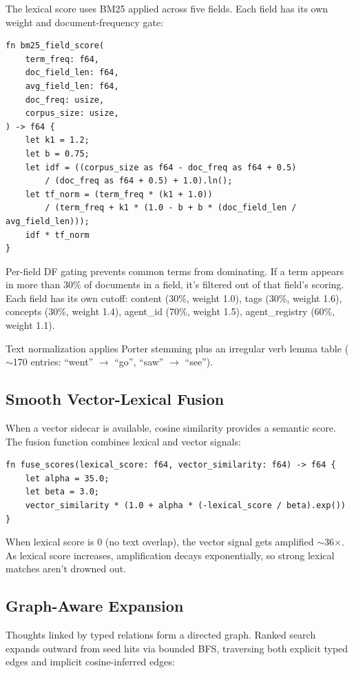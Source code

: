 \documentclass[11pt,a4paper]{article}
\begin{document}
The lexical score uses BM25 applied across five fields. Each field has its own weight and
document-frequency gate:

\begin{lstlisting}
fn bm25_field_score(
    term_freq: f64,
    doc_field_len: f64,
    avg_field_len: f64,
    doc_freq: usize,
    corpus_size: usize,
) -> f64 {
    let k1 = 1.2;
    let b = 0.75;
    let idf = ((corpus_size as f64 - doc_freq as f64 + 0.5)
        / (doc_freq as f64 + 0.5) + 1.0).ln();
    let tf_norm = (term_freq * (k1 + 1.0))
        / (term_freq + k1 * (1.0 - b + b * (doc_field_len / avg_field_len)));
    idf * tf_norm
}
\end{lstlisting}

Per-field DF gating prevents common terms from dominating. If a term appears in more than
30\% of documents in a field, it's filtered out of that field's scoring. Each field has its
own cutoff: content (30\%, weight 1.0), tags (30\%, weight 1.6), concepts (30\%, weight 1.4),
agent\_id (70\%, weight 1.5), agent\_registry (60\%, weight 1.1).

Text normalization applies Porter stemming plus an irregular verb lemma table ($\sim$170
entries: ``went'' $\to$ ``go'', ``saw'' $\to$ ``see'').

\subsection{Smooth Vector-Lexical Fusion}

When a vector sidecar is available, cosine similarity provides a semantic score. The fusion
function combines lexical and vector signals:

\begin{lstlisting}
fn fuse_scores(lexical_score: f64, vector_similarity: f64) -> f64 {
    let alpha = 35.0;
    let beta = 3.0;
    vector_similarity * (1.0 + alpha * (-lexical_score / beta).exp())
}
\end{lstlisting}

When lexical score is 0 (no text overlap), the vector signal gets amplified $\sim$36$\times$.
As lexical score increases, amplification decays exponentially, so strong lexical matches
aren't drowned out.

\subsection{Graph-Aware Expansion}

Thoughts linked by typed relations form a directed graph. Ranked search expands outward
from seed hits via bounded BFS, traversing both explicit typed edges and implicit
cosine-inferred edges:
\end{document}
